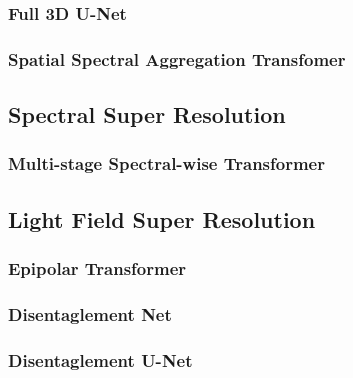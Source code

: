 \subsubsection{Full 3D U-Net}


\subsubsection{Spatial Spectral Aggregation Transfomer}


\subsection{Spectral Super Resolution}

\subsubsection{Multi-stage Spectral-wise Transformer}


\subsection{Light Field Super Resolution}

\subsubsection{Epipolar Transformer}


\subsubsection{Disentaglement Net}
\label{section:distg_net}


\subsubsection{Disentaglement U-Net}
